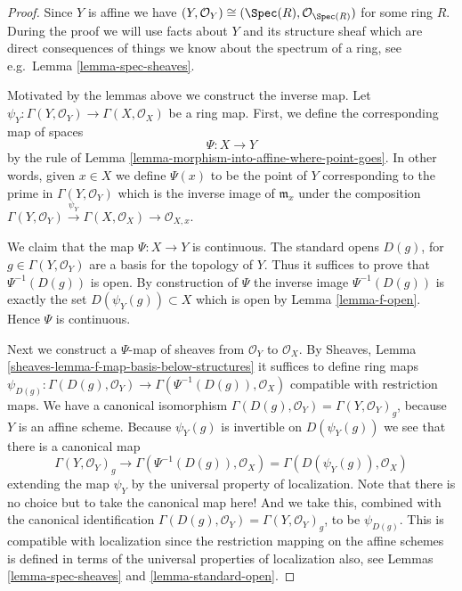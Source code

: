 \begin{proof}
Since $Y$ is affine we have
$(Y, \mathcal{O}_Y) \cong (\Spec(R), \mathcal{O}_{\Spec(R)})$
for some ring $R$.
During the proof we will use facts about $Y$ and
its structure sheaf which are direct consequences of things
we know about the spectrum of a ring, see e.g.\ Lemma
\ref{lemma-spec-sheaves}.

\medskip\noindent
Motivated by the lemmas above we construct the inverse map.
Let $\psi_Y : \Gamma(Y, \mathcal{O}_Y) \to \Gamma(X, \mathcal{O}_X)$
be a ring map. First, we define the corresponding map of
spaces
$$
\Psi : X \longrightarrow Y
$$
by the rule of
Lemma \ref{lemma-morphism-into-affine-where-point-goes}.
In other words, given $x \in X$ we define $\Psi(x)$
to be the point of $Y$ corresponding to the prime
in $\Gamma(Y, \mathcal{O}_Y)$ which is the inverse
image of $\mathfrak m_x$ under the composition
$
\Gamma(Y, \mathcal{O}_Y) \xrightarrow{\psi_Y}
\Gamma(X, \mathcal{O}_X) \to
\mathcal{O}_{X, x}
$.

\medskip\noindent
We claim that the map $\Psi : X \to Y$ is continuous.
The standard opens $D(g)$, for $g \in \Gamma(Y, \mathcal{O}_Y)$
are a basis for the topology of $Y$. Thus it suffices to prove
that $\Psi^{-1}(D(g))$ is open. By construction of $\Psi$
the inverse image $\Psi^{-1}(D(g))$ is exactly the set
$D(\psi_Y(g)) \subset X$ which is open by Lemma \ref{lemma-f-open}.
Hence $\Psi$ is continuous.

\medskip\noindent
Next we construct a $\Psi$-map of sheaves from
$\mathcal{O}_Y$ to $\mathcal{O}_X$. By
Sheaves, Lemma \ref{sheaves-lemma-f-map-basis-below-structures}
it suffices to define ring maps
$\psi_{D(g)} : \Gamma(D(g), \mathcal{O}_Y) \to
\Gamma(\Psi^{-1}(D(g)), \mathcal{O}_X)$
compatible with restriction maps.
We have a canonical isomorphism
$\Gamma(D(g), \mathcal{O}_Y) = \Gamma(Y, \mathcal{O}_Y)_g$,
because $Y$ is an affine scheme.
Because $\psi_Y(g)$ is invertible on $D(\psi_Y(g))$
we see that there is a canonical map
$$
\Gamma(Y, \mathcal{O}_Y)_g
\longrightarrow
\Gamma(\Psi^{-1}(D(g)), \mathcal{O}_X)
=
\Gamma(D(\psi_Y(g)), \mathcal{O}_X)
$$
extending the map $\psi_Y$
by the universal property of localization.
Note that there is no choice but to take the canonical map here!
And we take this, combined
with the canonical identification
$\Gamma(D(g), \mathcal{O}_Y) = \Gamma(Y, \mathcal{O}_Y)_g$, to
be $\psi_{D(g)}$. This is compatible with localization since the
restriction mapping on the affine schemes is defined in terms
of the universal properties of localization also, see
Lemmas \ref{lemma-spec-sheaves} and \ref{lemma-standard-open}.


\end{proof}
